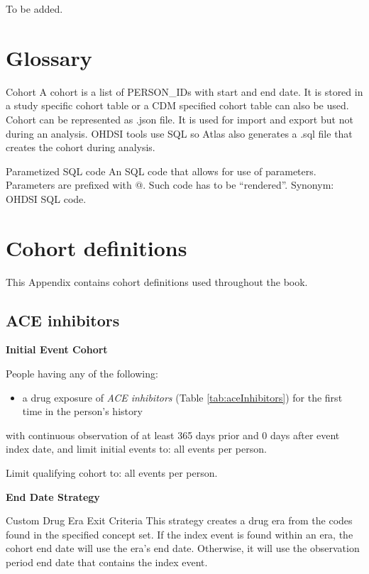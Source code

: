 \documentclass[11pt]{book}
\providecommand{\tightlist}{%
  \setlength{\itemsep}{0pt}\setlength{\parskip}{0pt}}
\theoremstyle{definition}
\theoremstyle{definition}
\theoremstyle{definition}
\theoremstyle{remark}
\begin{document}
To be added.

\hypertarget{appendix-appendix}{%
\appendix {}}


\hypertarget{Glossary}{%
\chapter{Glossary}\label{Glossary}}

Cohort
A cohort is a list of PERSON\_IDs with start and end date. It is stored in a study specific cohort table or a CDM specified cohort table can also be used. Cohort can be represented as .json file. It is used for import and export but not during an analysis. OHDSI tools use SQL so Atlas also generates a .sql file that creates the cohort during analysis.

Parametized SQL code
An SQL code that allows for use of parameters. Parameters are prefixed with @. Such code has to be ``rendered''. Synonym: OHDSI SQL code.

\hypertarget{CohortDefinitions}{%
\chapter{Cohort definitions}\label{CohortDefinitions}}

This Appendix contains cohort definitions used throughout the book.

\hypertarget{AceInhibitors}{%
\section{ACE inhibitors}\label{AceInhibitors}}

\textbf{Initial Event Cohort}

People having any of the following:

\begin{itemize}
\tightlist
\item
  a drug exposure of \emph{ACE inhibitors} (Table \ref{tab:aceInhibitors}) for the first time in the person's history
\end{itemize}

with continuous observation of at least 365 days prior and 0 days after event index date, and limit initial events to: all events per person.

Limit qualifying cohort to: all events per person.

\textbf{End Date Strategy}

Custom Drug Era Exit Criteria
This strategy creates a drug era from the codes found in the specified concept set. If the index event is found within an era, the cohort end date will use the era's end date. Otherwise, it will use the observation period end date that contains the index event.
\end{document}
